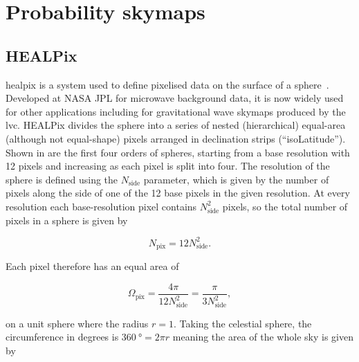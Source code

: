 \section{Probability skymaps}
\label{sec:mapping_the_sky}
\begin{colsection}


\begin{colsection}


\end{colsection}


\subsection{HEALPix}
\label{sec:healpix}
\begin{colsection}

\gls{healpix} is a system used to define pixelised data on the surface of a sphere~\citep{HEALPix}. Developed at NASA JPL for microwave background data, it is now widely used for other applications including for gravitational wave skymaps produced by the \gls{lvc}. HEALPix divides the sphere into a series of nested (hierarchical) equal-area (although not equal-shape) pixels arranged in declination strips (``isoLatitude''). Shown in  are the first four orders of spheres, starting from a base resolution with 12 pixels and increasing as each pixel is split into four. The resolution of the sphere is defined using the $N_\text{side}$ parameter, which is given by the number of pixels along the side of one of the 12 base pixels in the given resolution. At every resolution each base-resolution pixel contains $N_\text{side}^2$ pixels, so the total number of pixels in a sphere is given by

\begin{equation}
    N_\text{pix} = 12 N_\text{side}^2.
    \label{eq:healpix_npix}
\end{equation}

Each pixel therefore has an equal area of

\begin{equation}
    \Omega_\text{pix} = \frac{4\pi}{12 N_\text{side}^2} = \frac{\pi}{3 N_\text{side}^2},
    \label{eq:healpix_area}
\end{equation}

on a unit sphere where the radius $r=1$. Taking the celestial sphere, the circumference in degrees is $\SI{360}{\degree} = 2 \pi r$ meaning the area of the whole sky is given by


\end{colsection}
\end{colsection}
